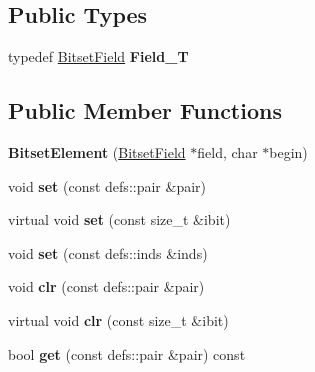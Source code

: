 \subsection*{Public Types}
\begin{DoxyCompactItemize}
\item 
typedef \hyperlink{classBitsetField}{Bitset\+Field} {\bfseries Field\+\_\+T}\hypertarget{classBitsetElement_ac6669f289b7f7793033b515911a89ff2}{}\label{classBitsetElement_ac6669f289b7f7793033b515911a89ff2}

\end{DoxyCompactItemize}
\subsection*{Public Member Functions}
\begin{DoxyCompactItemize}
\item 
{\bfseries Bitset\+Element} (\hyperlink{classBitsetField}{Bitset\+Field} $\ast$field, char $\ast$begin)\hypertarget{classBitsetElement_a84dd9f9e7dc0e559cdffe848f4dbd0f6}{}\label{classBitsetElement_a84dd9f9e7dc0e559cdffe848f4dbd0f6}

\item 
void {\bfseries set} (const defs\+::pair \&pair)\hypertarget{classBitsetElement_aed98af5268c63c2859507472e50c24af}{}\label{classBitsetElement_aed98af5268c63c2859507472e50c24af}

\item 
virtual void {\bfseries set} (const size\+\_\+t \&ibit)\hypertarget{classBitsetElement_a3997088e469e8235766eafbda0170cae}{}\label{classBitsetElement_a3997088e469e8235766eafbda0170cae}

\item 
void {\bfseries set} (const defs\+::inds \&inds)\hypertarget{classBitsetElement_aeb2427fdcfc7f1535ace3ae7bb2bdfa4}{}\label{classBitsetElement_aeb2427fdcfc7f1535ace3ae7bb2bdfa4}

\item 
void {\bfseries clr} (const defs\+::pair \&pair)\hypertarget{classBitsetElement_a5978a3fe1030b84fff24fd029a98c3c2}{}\label{classBitsetElement_a5978a3fe1030b84fff24fd029a98c3c2}

\item 
virtual void {\bfseries clr} (const size\+\_\+t \&ibit)\hypertarget{classBitsetElement_a58179bb0a57727a6f0b9a151e56d4b7b}{}\label{classBitsetElement_a58179bb0a57727a6f0b9a151e56d4b7b}

\item 
bool {\bfseries get} (const defs\+::pair \&pair) const \hypertarget{classBitsetElement_abf16866243c3b1dfb19f90b3676756eb}{}\label{classBitsetElement_abf16866243c3b1dfb19f90b3676756eb}


\end{DoxyCompactItemize}
